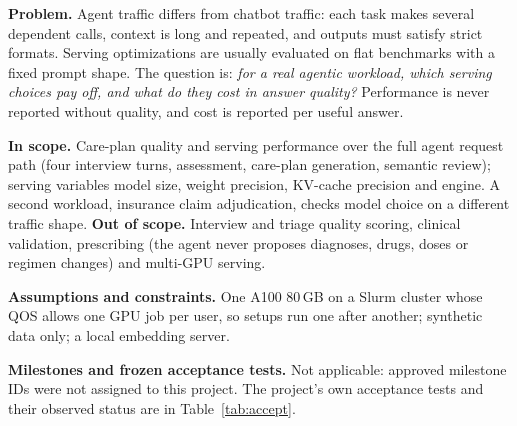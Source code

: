 \documentclass[conference]{IEEEtran}
\begin{document}
\textbf{Problem.} Agent traffic differs from chatbot traffic: each task makes several dependent calls, context is long and repeated, and outputs must satisfy strict formats. Serving optimizations are usually evaluated on flat benchmarks with a fixed prompt shape. The question is: \emph{for a real agentic workload, which serving choices pay off, and what do they cost in answer quality?} Performance is never reported without quality, and cost is reported per useful answer.

\textbf{In scope.} Care-plan quality and serving performance over the full agent request path (four interview turns, assessment, care-plan generation, semantic review); serving variables model size, weight precision, KV-cache precision and engine. A second workload, insurance claim adjudication, checks model choice on a different traffic shape. \textbf{Out of scope.} Interview and triage quality scoring, clinical validation, prescribing (the agent never proposes diagnoses, drugs, doses or regimen changes) and multi-GPU serving.

\textbf{Assumptions and constraints.} One A100 80\,GB on a Slurm cluster whose QOS allows one GPU job per user, so setups run one after another; synthetic data only; a local embedding server.

\textbf{Milestones and frozen acceptance tests.} Not applicable: approved milestone IDs were not assigned to this project. The project's own acceptance tests and their observed status are in Table~\ref{tab:accept}.
\end{document}
